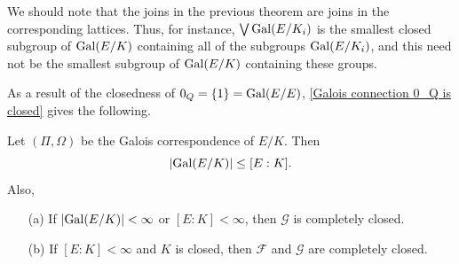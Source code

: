 We should note that the joins in the previous theorem are joins in the
corresponding lattices. Thus, for instance, $\bigvee \mathrm{Gal}(E/K_i)$ is the smallest closed subgroup of $\mathrm{Gal}(E/K)$ containing all of the subgroups $\mathrm{Gal}(E/K_i)$, and this need not be the smallest subgroup of $\mathrm{Gal}(E/K)$ containing these groups.\par
As a result of the closedness of $0_Q=\{1\}=\mathrm{Gal}(E/E)$, \cref{Galois connection 0_Q is closed} gives the following.
\begin{corollary}
Let $(\Pi,\Omega)$ be the Galois correspondence of $E/K$. Then
\[|\mathrm{Gal}(E/K)|\leq[E:K].\]
Also,
\begin{itemize}
\item[(a)] If $|\mathrm{Gal}(E/K)|<\infty$ or $[E:K]<\infty$, then $\mathcal{G}$ is completely closed.
\item[(b)] If $[E:K]<\infty$ and $K$ is closed, then $\mathcal{F}$ and $\mathcal{G}$ are completely closed. 
\end{itemize}
\end{corollary}
